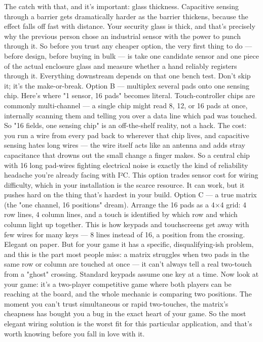 The catch with that, and it's important: glass thickness. Capacitive sensing through a barrier gets dramatically harder as the barrier thickens, because the effect falls off fast with distance. Your security glass is thick, and that's precisely why the previous person chose an industrial sensor with the power to punch through it. So before you trust any cheaper option, the very first thing to do — before design, before buying in bulk — is take one candidate sensor and one piece of the actual enclosure glass and measure whether a hand reliably registers through it. Everything downstream depends on that one bench test. Don't skip it; it's the make-or-break.
Option B — multiplex several pads onto one sensing chip. Here's where "1 sensor, 16 pads" becomes literal. Touch-controller chips are commonly multi-channel — a single chip might read 8, 12, or 16 pads at once, internally scanning them and telling you over a data line which pad was touched. So "16 fields, one sensing chip" is an off-the-shelf reality, not a hack. The cost: you run a wire from every pad back to wherever that chip lives, and capacitive sensing hates long wires — the wire itself acts like an antenna and adds stray capacitance that drowns out the small change a finger makes. So a central chip with 16 long pad-wires fighting electrical noise is exactly the kind of reliability headache you're already facing with I²C. This option trades sensor cost for wiring difficulty, which in your installation is the scarce resource. It can work, but it pushes hard on the thing that's hardest in your build.
Option C — a true matrix (the "one channel, 16 positions" dream). Arrange the 16 pads as a 4×4 grid: 4 row lines, 4 column lines, and a touch is identified by which row and which column light up together. This is how keypads and touchscreens get away with few wires for many keys — 8 lines instead of 16, a position from the crossing. Elegant on paper. But for your game it has a specific, disqualifying-ish problem, and this is the part most people miss: a matrix struggles when two pads in the same row or column are touched at once — it can't always tell a real two-touch from a "ghost" crossing. Standard keypads assume one key at a time. Now look at your game: it's a two-player competitive game where both players can be reaching at the board, and the whole mechanic is comparing two positions. The moment you can't trust simultaneous or rapid two-touches, the matrix's cheapness has bought you a bug in the exact heart of your game. So the most elegant wiring solution is the worst fit for this particular application, and that's worth knowing before you fall in love with it.
